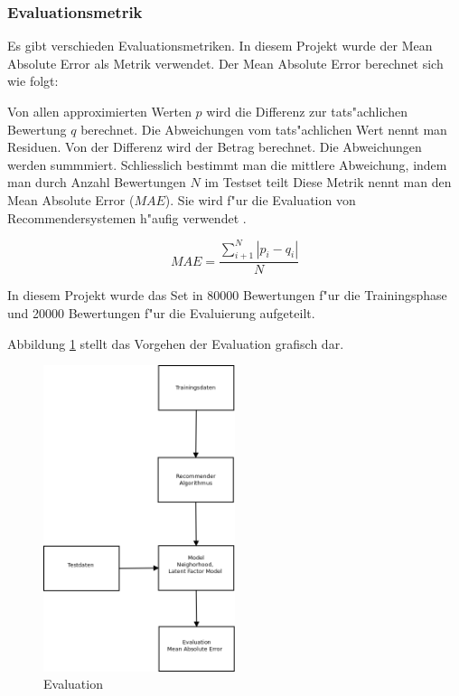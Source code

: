 \documentclass[a4paper, 12pt]{article}
\begin{document}
\subsubsection{Evaluationsmetrik}
\label{sec:evaluationmetrik}

Es gibt verschieden Evaluationsmetriken. In diesem Projekt wurde der Mean Absolute Error als Metrik verwendet. Der Mean Absolute Error berechnet sich wie folgt:

Von allen approximierten Werten $p$ wird die Differenz zur tats"achlichen Bewertung $q$ berechnet. Die Abweichungen vom tats"achlichen Wert nennt man Residuen. Von der Differenz wird der Betrag berechnet. Die Abweichungen werden summmiert. Schliesslich bestimmt man die mittlere Abweichung, indem man durch Anzahl Bewertungen $N$ im Testset teilt 
 Diese Metrik nennt man den Mean Absolute Error ($MAE$). Sie wird f"ur die Evaluation von Recommendersystemen h"aufig verwendet \cite{sarwar01}. 

\begin{equation}
  \label{eq:mae}
  MAE = \frac{\sum_{i+1}^N | p_i-q_i | }{N}
\end{equation}

In diesem Projekt wurde das Set in 80000 Bewertungen f"ur die Trainingsphase und 20000 Bewertungen f"ur die Evaluierung aufgeteilt.

Abbildung \ref{fig:crossvalidation} stellt das Vorgehen der Evaluation grafisch dar.

\begin{figure}
  \centering
      \includegraphics[width=0.5\textwidth]{evaluation}
  \caption{Evaluation}
  \label{fig:crossvalidation}
\end{figure}
\end{document}
